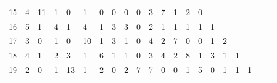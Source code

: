 \begin{table}
\begin{tabular}{lp{0.7cm}p{0.7cm}p{0.7cm}p{0.7cm}p{0.7cm}p{0.7cm}p{0.7cm}p{0.7cm}p{0.7cm}p{0.7cm}p{0.7cm}p{0.7cm}p{0.7cm}p{0.7cm}p{0.7cm}p{0.7cm}p{0.7cm}p{0.7cm}p{0.7cm}p{0.7cm}}
15     &   4 & 11 &  1 &  0 &  1 &  0 &  0 &  0 &  0 &   3 &   7 &   1 &   2 &   0 &     &     &     &     \\
16     &   5 &  1 &  4 &  1 &  4 &  1 &  3 &  3 &  0 &   2 &   1 &   1 &   1 &   1 &   1 &     &     &     \\
17     &   3 &  0 &  1 &  0 & 10 &  1 &  3 &  1 &  0 &   4 &   2 &   7 &   0 &   0 &   1 &   2 &     &     \\
18     &   4 &  1 &  2 &  3 &  1 &  6 &  1 &  1 &  0 &   3 &   4 &   2 &   8 &   1 &   3 &   1 &   1 &     \\
19     &   2 &  0 &  1 & 13 &  1 &  2 &  0 &  2 &  7 &   7 &   0 &   0 &   1 &   5 &   0 &   1 &   1 &   1 \\
\bottomrule
\end{tabular}
\end{table}
